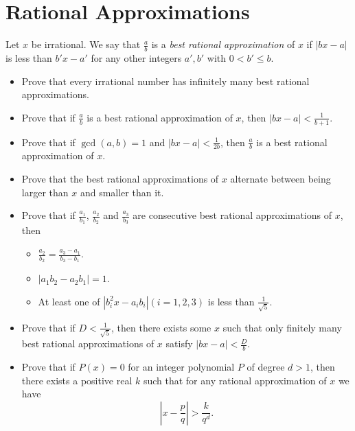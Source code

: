 \documentclass{article}
\begin{document}
\section{Rational Approximations}
Let $x$ be irrational. We say that $\frac ab$ is a \emph{best rational
	approximation} of $x$ if $|bx-a|$ is less than $b'x-a'$ for any other integers
$a',b'$ with $0<b'\le b$.
\begin{itemize}
	\item Prove that every irrational number has infinitely many best rational
	      approximations.
	\item Prove that if $\frac ab$ is a best rational approximation of $x$, then
	      $|bx-a|<\frac 1{b+1}$.
	\item Prove that if $\gcd(a,b)=1$ and $|bx-a|<\frac 1{2b}$, then $\frac ab$
	      is a best rational approximation of $x$.
	\item Prove that the best rational approximations of $x$ alternate between
	      being larger than $x$ and smaller than it.
	\item Prove that if $\frac{a_1}{b_1}$, $\frac{a_2}{b_2}$ and
	      $\frac{a_3}{b_3}$ are consecutive best rational approximations of $x$,
	      then
	      \begin{itemize}
		      \item $\frac{a_2}{b_2}=\frac{a_3-a_1}{b_3-b_1}$.
		      \item $|a_1b_2-a_2b_1|=1$.
		      \item At least one of $|b_i^2 x-a_i b_i|(i=1,2,3)$ is less than $\frac
			            1{\sqrt 5}$.
	      \end{itemize}
	\item Prove that if $D<\frac 1{\sqrt 5}$, then there exists some $x$ such
	      that only finitely many best rational approximations of $x$ satisfy
	      $|bx-a|<\frac Db$.
	\item Prove that if $P(x)=0$ for an integer polynomial $P$ of degree $d>1$,
	      then there exists a positive real $k$ such that for any rational
	      approximation of $x$ we have
	      \[\left|x-\frac pq\right|>\frac k{q^d}.\]
\end{itemize}
\end{document}
